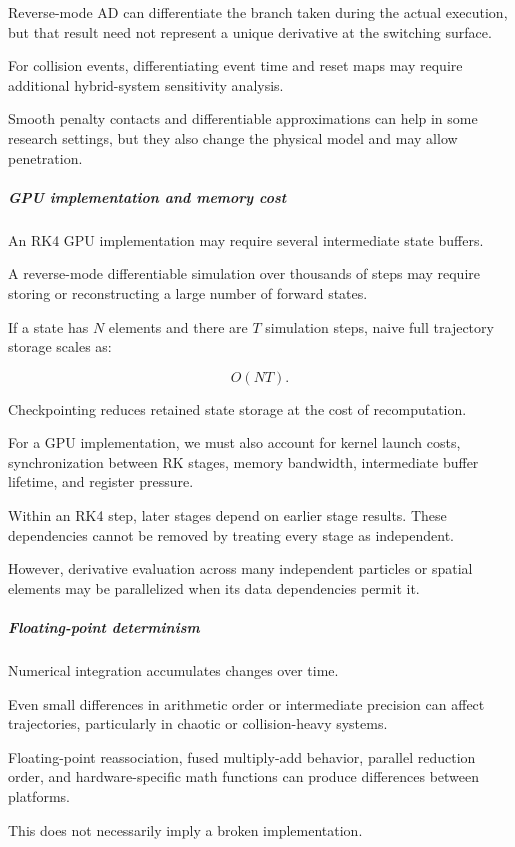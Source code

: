 Reverse-mode AD can differentiate the branch taken during the actual execution, but that result need not represent a unique derivative at the switching surface.

For collision events, differentiating event time and reset maps may require additional hybrid-system sensitivity analysis.

Smooth penalty contacts and differentiable approximations can help in some research settings, but they also change the physical model and may allow penetration.

\subparagraph{GPU implementation and memory cost}\label{gpu-implementation-and-memory-cost}

An RK4 GPU implementation may require several intermediate state buffers.

A reverse-mode differentiable simulation over thousands of steps may require storing or reconstructing a large number of forward states.

If a state has \(N\) elements and there are \(T\) simulation steps, naive full trajectory storage scales as:

\[
O(NT).
\]

Checkpointing reduces retained state storage at the cost of recomputation.

For a GPU implementation, we must also account for kernel launch costs, synchronization between RK stages, memory bandwidth, intermediate buffer lifetime, and register pressure.

Within an RK4 step, later stages depend on earlier stage results. These dependencies cannot be removed by treating every stage as independent.

However, derivative evaluation across many independent particles or spatial elements may be parallelized when its data dependencies permit it.

\subparagraph{Floating-point determinism}\label{floating-point-determinism}

Numerical integration accumulates changes over time.

Even small differences in arithmetic order or intermediate precision can affect trajectories, particularly in chaotic or collision-heavy systems.

Floating-point reassociation, fused multiply-add behavior, parallel reduction order, and hardware-specific math functions can produce differences between platforms.

This does not necessarily imply a broken implementation.

